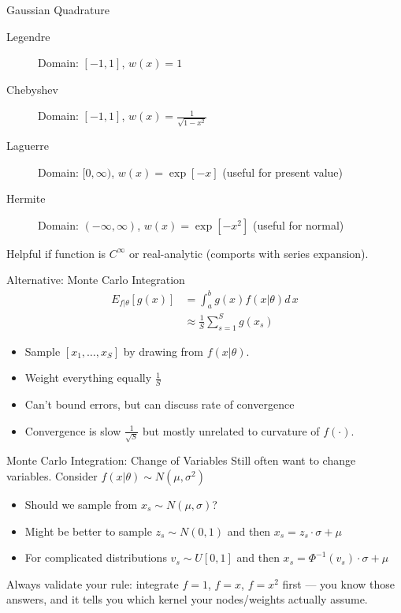 \documentclass[aspectratio=169,11pt]{beamer}
\begin{document}
\begin{frame}{Gaussian Quadrature}
\begin{description}
\item[Legendre] Domain: $[-1,1]$, $w(x) = 1$
\item[Chebyshev] Domain: $[-1,1]$, $w(x) = \frac{1}{\sqrt{1-x^2}}$
\item[Laguerre] Domain: $[0,\infty)$, $w(x) = \exp[-x]$ (useful for present value)
\item[Hermite] Domain: $(-\infty,\infty)$, $w(x) = \exp[-x^2]$ (useful for normal)
\end{description}
Helpful if function is $C^{\infty}$ or real-analytic (comports with series expansion).
\end{frame}



\begin{frame}{Alternative: Monte Carlo Integration}
\begin{align*}
E_{f| \theta}[g(x)] &= \int_{a}^b g(x) f(x | \theta) d\,x\\
&\approx \frac{1}{S} \sum_{s=1}^S g(x_s)
\end{align*}
\begin{itemize}
\item Sample $[x_1,\ldots,x_S]$ by drawing from $f(x | \theta)$.
\item Weight everything equally $\frac{1}{S}$
\item Can't bound errors, but can discuss rate of convergence
\item Convergence is slow $\frac{1}{\sqrt{S}}$ but mostly unrelated to curvature of $f(\cdot)$.
\end{itemize}
\end{frame}


\begin{frame}{Monte Carlo Integration: Change of Variables}
Still often want to change variables. Consider $f(x | \theta) \sim N(\mu,\sigma^2)$
\begin{itemize}
\item Should we sample from $x_s \sim N(\mu,\sigma)$?
\item Might be better to sample $z_s \sim N(0,1)$ and then $x_s = z_s\cdot \sigma + \mu$
\item For complicated distributions $v_s \sim U[0,1]$ and then $x_s = \Phi^{-1}(v_s) \cdot \sigma + \mu$
\end{itemize}
\alert{Always validate your rule}: integrate $f = 1$, $f = x$, $f = x^2$ first --- you know those answers, and it tells you which kernel your nodes/weights actually assume.
\end{frame}
\end{document}

